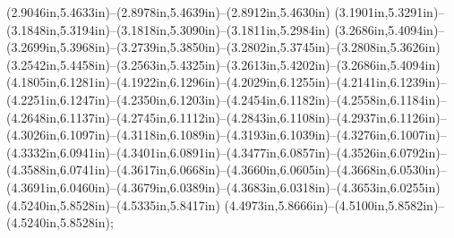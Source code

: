 (2.9046in,5.4633in)--(2.8978in,5.4639in)--(2.8912in,5.4630in) (3.1901in,5.3291in)--(3.1848in,5.3194in)--(3.1818in,5.3090in)--(3.1811in,5.2984in) (3.2686in,5.4094in)--(3.2699in,5.3968in)--(3.2739in,5.3850in)--(3.2802in,5.3745in)--(3.2808in,5.3626in) (3.2542in,5.4458in)--(3.2563in,5.4325in)--(3.2613in,5.4202in)--(3.2686in,5.4094in) (4.1805in,6.1281in)--(4.1922in,6.1296in)--(4.2029in,6.1255in)--(4.2141in,6.1239in)--(4.2251in,6.1247in)--(4.2350in,6.1203in)--(4.2454in,6.1182in)--(4.2558in,6.1184in)--(4.2648in,6.1137in)--(4.2745in,6.1112in)--(4.2843in,6.1108in)--(4.2937in,6.1126in)--(4.3026in,6.1097in)--(4.3118in,6.1089in)--(4.3193in,6.1039in)--(4.3276in,6.1007in)--(4.3332in,6.0941in)--(4.3401in,6.0891in)--(4.3477in,6.0857in)--(4.3526in,6.0792in)--(4.3588in,6.0741in)--(4.3617in,6.0668in)--(4.3660in,6.0605in)--(4.3668in,6.0530in)--(4.3691in,6.0460in)--(4.3679in,6.0389in)--(4.3683in,6.0318in)--(4.3653in,6.0255in) (4.5240in,5.8528in)--(4.5335in,5.8417in) (4.4973in,5.8666in)--(4.5100in,5.8582in)--(4.5240in,5.8528in);
